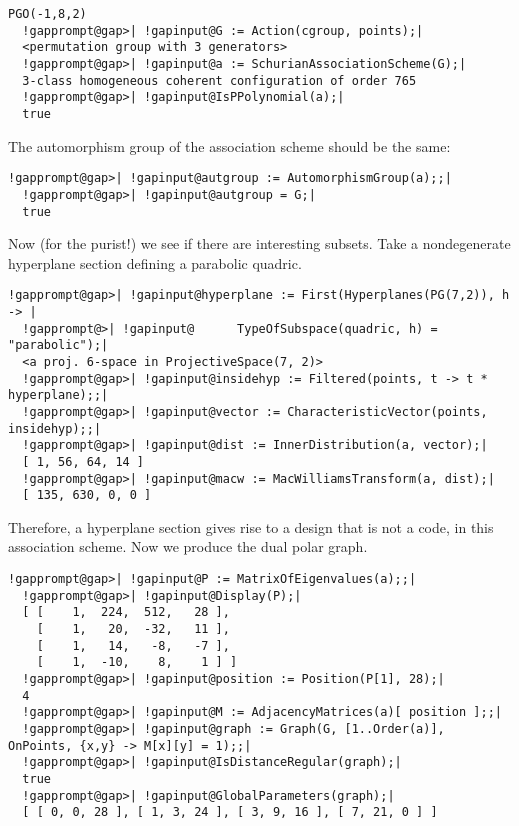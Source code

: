 \documentclass[a4paper,11pt]{report}
\begin{document}
{{\begin{Verbatim}[commandchars=!@|,fontsize=\small,frame=single,label=Example]
  PGO(-1,8,2)
  !gapprompt@gap>| !gapinput@G := Action(cgroup, points);|
  <permutation group with 3 generators>
  !gapprompt@gap>| !gapinput@a := SchurianAssociationScheme(G);|
  3-class homogeneous coherent configuration of order 765
  !gapprompt@gap>| !gapinput@IsPPolynomial(a);|
  true
\end{Verbatim}
 The automorphism group of the association scheme should be the same: 
\begin{Verbatim}[commandchars=!@|,fontsize=\small,frame=single,label=Example]
  !gapprompt@gap>| !gapinput@autgroup := AutomorphismGroup(a);;|
  !gapprompt@gap>| !gapinput@autgroup = G;|
  true
\end{Verbatim}
 Now (for the purist!) we see if there are interesting subsets. Take a
nondegenerate hyperplane section defining a parabolic quadric. 
\begin{Verbatim}[commandchars=!@|,fontsize=\small,frame=single,label=Example]
  !gapprompt@gap>| !gapinput@hyperplane := First(Hyperplanes(PG(7,2)), h -> |
  !gapprompt@>| !gapinput@		TypeOfSubspace(quadric, h) = "parabolic");|
  <a proj. 6-space in ProjectiveSpace(7, 2)>
  !gapprompt@gap>| !gapinput@insidehyp := Filtered(points, t -> t * hyperplane);;|
  !gapprompt@gap>| !gapinput@vector := CharacteristicVector(points, insidehyp);;|
  !gapprompt@gap>| !gapinput@dist := InnerDistribution(a, vector);|
  [ 1, 56, 64, 14 ]
  !gapprompt@gap>| !gapinput@macw := MacWilliamsTransform(a, dist);|
  [ 135, 630, 0, 0 ]
\end{Verbatim}
 Therefore, a hyperplane section gives rise to a design that is not a code, in
this association scheme. Now we produce the dual polar graph. 
\begin{Verbatim}[commandchars=!@|,fontsize=\small,frame=single,label=Example]
  !gapprompt@gap>| !gapinput@P := MatrixOfEigenvalues(a);;|
  !gapprompt@gap>| !gapinput@Display(P);|
  [ [    1,  224,  512,   28 ],
    [    1,   20,  -32,   11 ],
    [    1,   14,   -8,   -7 ],
    [    1,  -10,    8,    1 ] ]
  !gapprompt@gap>| !gapinput@position := Position(P[1], 28);|
  4
  !gapprompt@gap>| !gapinput@M := AdjacencyMatrices(a)[ position ];;|
  !gapprompt@gap>| !gapinput@graph := Graph(G, [1..Order(a)], OnPoints, {x,y} -> M[x][y] = 1);;|
  !gapprompt@gap>| !gapinput@IsDistanceRegular(graph);|
  true
  !gapprompt@gap>| !gapinput@GlobalParameters(graph);|
  [ [ 0, 0, 28 ], [ 1, 3, 24 ], [ 3, 9, 16 ], [ 7, 21, 0 ] ]
\end{Verbatim}
 }

 
}
\end{document}
